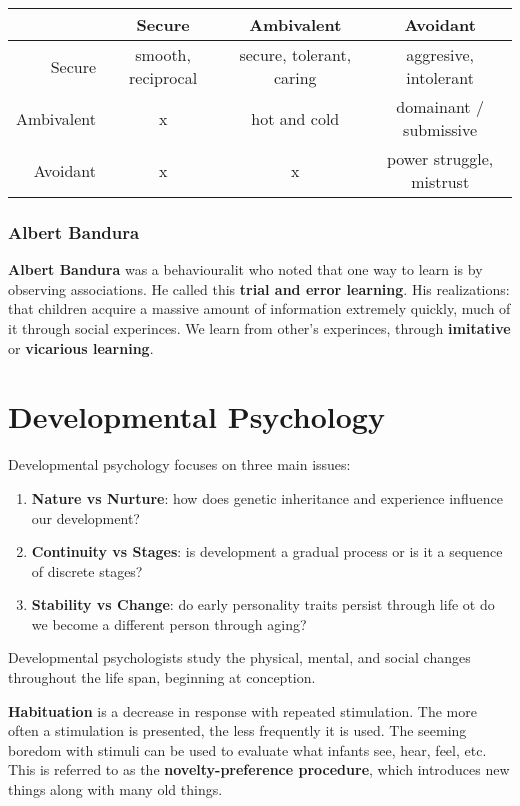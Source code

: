 \documentclass[12pt]{article}
\begin{document}
\begin{table}[ht]
\centering
\begin{tabular}{r|ccc}
  & Secure & Ambivalent & Avoidant \\ \hline
  Secure & smooth, reciprocal & secure, tolerant, caring & aggresive, intolerant \\
  Ambivalent & x & hot and cold & domainant / submissive \\
  Avoidant & x & x & power struggle, mistrust
\end{tabular}
\end{table}

\subsubsection*{Albert Bandura}
{\bf Albert Bandura} was a behaviouralit who noted that one way to learn is by observing associations. He called this {\bf trial and error learning}. His realizations: that children acquire a massive amount of information extremely quickly, much of it through social experinces. We learn from other's experinces, through {\bf imitative} or {\bf vicarious learning}.

\section*{Developmental Psychology}
Developmental psychology focuses on three main issues:
\begin{enumerate}
\item {\bf Nature vs Nurture}: how does genetic inheritance and experience influence our development?
\item {\bf Continuity vs Stages}: is development a gradual process or is it a sequence of discrete stages?
\item {\bf Stability vs Change}: do early personality traits persist through life ot do we become a different person through aging?
\end{enumerate}

Developmental psychologists study the physical, mental, and social changes throughout the life span, beginning at conception.

{\bf Habituation} is a decrease in response with repeated stimulation. The more often a stimulation is presented, the less frequently it is used. The seeming boredom with stimuli can be used to evaluate what infants see, hear, feel, etc. This is referred to as the {\bf novelty-preference procedure}, which introduces new things along with many old things.
\end{document}
